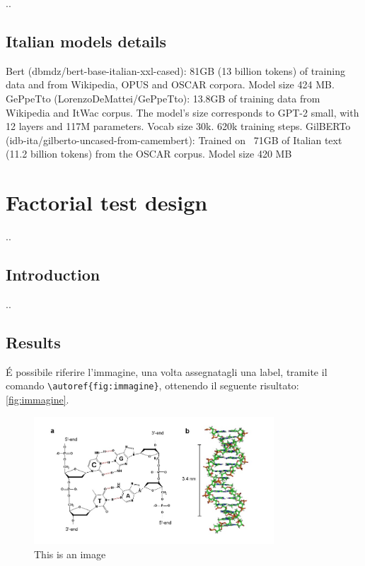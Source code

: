 ..


\subsection{Italian models details}

Bert (dbmdz/bert-base-italian-xxl-cased): 81GB (13 billion tokens) of training data  and from Wikipedia, OPUS and OSCAR corpora. Model size 424 MB.
GePpeTto (LorenzoDeMattei/GePpeTto): 13.8GB of training data from Wikipedia and ItWac corpus. The model’s size corresponds to GPT-2 small, with 12 layers and 117M parameters. Vocab size 30k. 620k training steps.
GilBERTo (idb-ita/gilberto-uncased-from-camembert): Trained on ~71GB of Italian text (11.2 billion tokens) from the OSCAR corpus. Model size 420 MB


\section{Factorial test design}

..

\subsection{Introduction}

..

\subsection{Results}


É possibile riferire l'immagine, una volta assegnatagli una label, tramite il comando \texttt{\textbackslash autoref\{fig:immagine\}}, ottenendo il seguente risultato: \autoref{fig:immagine}.

\begin{figure}
	\centering
	\includegraphics[width=0.8\textwidth]{images/Chapter1/immagine.jpg} %
	\caption{This is an image} 
	\label{fig:immagine} %
\end{figure}

